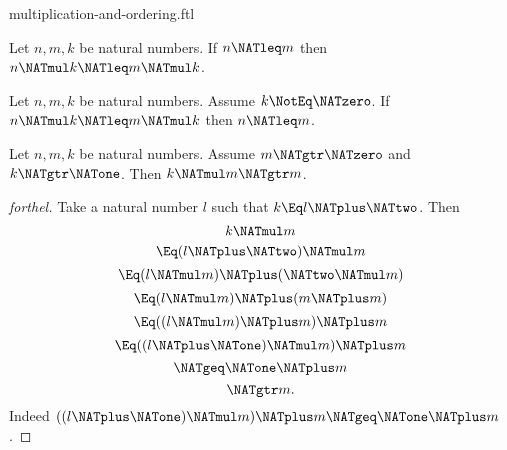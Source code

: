\documentclass{stex}
\begin{document}
\begin{smodule}{multiplication-and-ordering.ftl}
\begin{corollary}[forthel]
  Let $n, m, k$ be natural numbers.
  If $n \NATleq m$ then $n \NATmul k \NATleq m \NATmul k$.
\end{corollary}

\begin{corollary}[forthel]
  Let $n, m, k$ be natural numbers.
  Assume $k \NotEq \NATzero$.
  If $n \NATmul k \NATleq m \NATmul k$ then $n \NATleq m$.
\end{corollary}

\begin{proposition}[forthel]
  Let $n, m, k$ be natural numbers.
  Assume $m \NATgtr \NATzero$ and $k \NATgtr \NATone$.
  Then $k \NATmul m \NATgtr m$.
\end{proposition}
\begin{proof}[forthel]
  Take a natural number $l$ such that $k \Eq l \NATplus \NATtwo$.
  Then
  \[  k \NATmul m                       \]
  \[    \Eq (l \NATplus \NATtwo) \NATmul m             \]
  \[    \Eq (l \NATmul m) \NATplus (\NATtwo \NATmul m)   \]
  \[    \Eq (l \NATmul m) \NATplus (m \NATplus m)       \]
  \[    \Eq ((l \NATmul m) \NATplus m) \NATplus m       \]
  \[    \Eq ((l \NATplus \NATone) \NATmul m) \NATplus m       \]
  \[    \NATgeq \NATone \NATplus m                    \]
  \[    \NATgtr m.                          \]
  Indeed $((l \NATplus \NATone) \NATmul m) \NATplus m \NATgeq \NATone \NATplus m$.
\end{proof}
\end{smodule}
\end{document}
